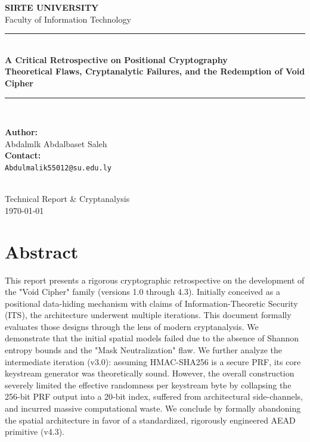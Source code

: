 \documentclass[12pt,a4paper]{article}
\begin{document}
\begin{titlepage}
    \centering
    \vspace*{1cm}
    {\Large\textbf{\textcolor{SecondaryBlue}{SIRTE UNIVERSITY}}}\\[0.2cm]
    {\large Faculty of Information Technology}\\[2cm]
    \textcolor{AccentGold}{\rule{\textwidth}{2pt}}\\[1cm]
    {\Huge\bfseries\textcolor{PrimaryBlue}{A Critical Retrospective on Positional Cryptography}}\\[0.5cm]
    {\Large\bfseries Theoretical Flaws, Cryptanalytic Failures, and the Redemption of Void Cipher}\\[1cm]
    \textcolor{AccentGold}{\rule{\textwidth}{2pt}}\\[2cm]
    \begin{minipage}{0.7\textwidth}
        \centering
        \large
        \textbf{Author:}\\
        Abdalmlk Abdalbaset Saleh\\
        \vspace{0.6cm}
        \textbf{Contact:}\\
        \texttt{Abdulmalik55012@su.edu.ly}
    \end{minipage}\\[2.5cm]
    \vfill
    {\large Technical Report \& Cryptanalysis}\\[0.2cm]
    {\large \today}
\end{titlepage}

\newpage
\tableofcontents
\newpage

\section*{Abstract}
This report presents a rigorous cryptographic retrospective on the development of the "Void Cipher" family (versions 1.0 through 4.3). Initially conceived as a positional data-hiding mechanism with claims of Information-Theoretic Security (ITS), the architecture underwent multiple iterations. This document formally evaluates those designs through the lens of modern cryptanalysis. We demonstrate that the initial spatial models failed due to the absence of Shannon entropy bounds and the "Mask Neutralization" flaw. We further analyze the intermediate iteration (v3.0): assuming HMAC-SHA256 is a secure PRF, its core keystream generator was theoretically sound. However, the overall construction severely limited the effective randomness per keystream byte by collapsing the 256-bit PRF output into a 20-bit index, suffered from architectural side-channels, and incurred massive computational waste. We conclude by formally abandoning the spatial architecture in favor of a standardized, rigorously engineered AEAD primitive (v4.3).
\end{document}
